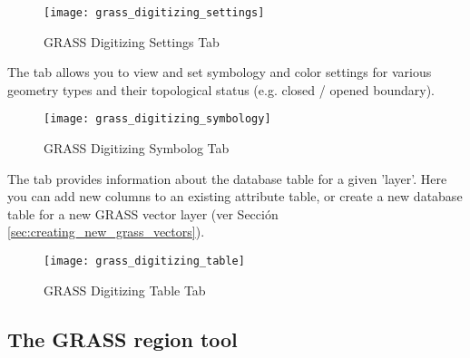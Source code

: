 \begin{figure}[h]
 \begin{center}
 \caption{GRASS Digitizing Settings Tab \nixcaption}\label{fig:grass_digitizing_settings}
 \texttt{[image: grass\_digitizing\_settings]}
 \end{center}
\end{figure}


The  tab allows you to view and set symbology and color
settings for various geometry types and their topological status (e.g. closed
/ opened boundary).

\begin{figure}[h]
 \begin{center}
 \caption{GRASS Digitizing Symbolog Tab \nixcaption}\label{fig:grass_digitizing_symbology}
 \texttt{[image: grass\_digitizing\_symbology]}
 \end{center}
\end{figure}

 

The  tab provides information about the database table for
a given 'layer'. Here you can add new columns to an existing attribute table,
or create a new database table for a new GRASS vector layer (ver Sección 
\ref{sec:creating_new_grass_vectors}).

\begin{figure}[h]
 \begin{center}
 \caption{GRASS Digitizing Table Tab \nixcaption}\label{fig:grass_digitizing_table}
 \texttt{[image: grass\_digitizing\_table]}
 \end{center}
\end{figure}

\begin{Tip}\caption{\textsc{GRASS Edit Permissions}}
\end{Tip} 

\subsection{The GRASS region tool}\label{sec:grass_region}

